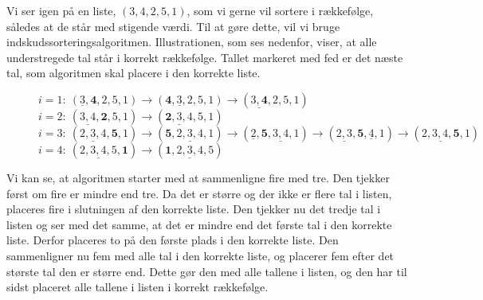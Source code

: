 \begin{exmp}
Vi ser igen på en liste, $(3,4,2,5,1)$, som vi gerne vil sortere i rækkefølge, således at de står med stigende værdi. Til at gøre dette, vil vi bruge indskudssorteringsalgoritmen. Illustrationen, som ses nedenfor, viser, at alle understregede tal står i korrekt rækkefølge. Tallet markeret med fed er det næste tal, som algoritmen skal placere i den korrekte liste.

\begin{figure}[H]
\label{fig:indskud}
	\begin{flushleft}
	$i=1: \ (\underline{3},\textbf{4},2,5,1) \rightarrow (\textbf{4}, \underline{3},2,5,1)\rightarrow (\underline{3,\textbf{4}},2,5,1)$ \\
	$i=2: \ (\underline{3,4},\textbf{2},5,1) \rightarrow (\underline{\textbf{2},3,4},5,1) $\\
	$i=3: \ (\underline{2,3,4},\textbf{5},1) \rightarrow (\textbf{5},\underline{2,3,4},1) \rightarrow (\underline{2}, \textbf{5},\underline{3,4},1) \rightarrow (\underline{2,3}, \textbf{5}, \underline{4},1) \rightarrow (\underline{2,3,4,\textbf{5}},1) $ \\
	$i=4: \ (\underline{2,3,4,5},\textbf{1}) \rightarrow (\underline{\textbf{1},2,3,4,5}) $\\
 	\end{flushleft}
\end{figure}

Vi kan se, at algoritmen starter med at sammenligne fire med tre. Den tjekker først om fire er mindre end tre. Da det er større og der ikke er flere tal i listen, placeres fire i slutningen af den korrekte liste. Den tjekker nu det tredje tal i listen og ser med det samme, at det er mindre end det første tal i den korrekte liste. Derfor placeres to på den første plads i den korrekte liste. Den sammenligner nu fem med alle tal i den korrekte liste, og placerer fem efter det største tal den er større end. Dette gør den med alle tallene i listen, og den har til sidst placeret alle tallene i listen i korrekt rækkefølge.


\end{exmp}